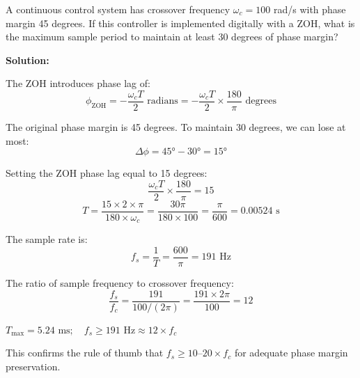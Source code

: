 \begin{example}
\label{ex:zoh_phase}
A continuous control system has crossover frequency $\omega_c = 100$ rad/s with phase margin 45 degrees. If this controller is implemented digitally with a ZOH, what is the maximum sample period to maintain at least 30 degrees of phase margin?

\textbf{Solution:}

The ZOH introduces phase lag of:
\begin{equation*}
\phi_{\text{ZOH}} = -\frac{\omega_c T}{2} \text{ radians} = -\frac{\omega_c T}{2} \times \frac{180}{\pi} \text{ degrees}
\end{equation*}

The original phase margin is 45 degrees. To maintain 30 degrees, we can lose at most:
\begin{equation*}
\Delta \phi = 45° - 30° = 15°
\end{equation*}

Setting the ZOH phase lag equal to 15 degrees:
\begin{equation*}
\frac{\omega_c T}{2} \times \frac{180}{\pi} = 15
\end{equation*}
\begin{equation*}
T = \frac{15 \times 2 \times \pi}{180 \times \omega_c} = \frac{30\pi}{180 \times 100} = \frac{\pi}{600} = 0.00524 \text{ s}
\end{equation*}

The sample rate is:
\begin{equation*}
f_s = \frac{1}{T} = \frac{600}{\pi} = 191 \text{ Hz}
\end{equation*}

The ratio of sample frequency to crossover frequency:
\begin{equation*}
\frac{f_s}{f_c} = \frac{191}{100/(2\pi)} = \frac{191 \times 2\pi}{100} = 12
\end{equation*}

$\boxed{T_{\max} = 5.24 \text{ ms}; \quad f_s \geq 191 \text{ Hz} \approx 12 \times f_c}$

This confirms the rule of thumb that $f_s \geq 10$--$20 \times f_c$ for adequate phase margin preservation.
\end{example}

